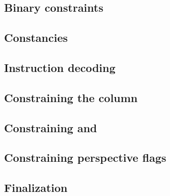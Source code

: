\subsection{Binary constraints}              \label{rlp utils: generalities: binarities}               
\subsection{Constancies}                     \label{rlp utils: generalities: constancies}              
\subsection{Instruction decoding}            \label{rlp utils: generalities: instruction decoding}     
\subsection{Constraining the \iomf{} column} \label{rlp utils: generalities: iomf}                     
\subsection{Constraining \ct{} and \maxCt{}} \label{rlp utils: generalities: ct and max_ct}            
\subsection{Constraining perspective flags}  \label{rlp utils: generalities: perspective flags}        
\subsection{Finalization}                    \label{rlp utils: generalities: finalization}             
